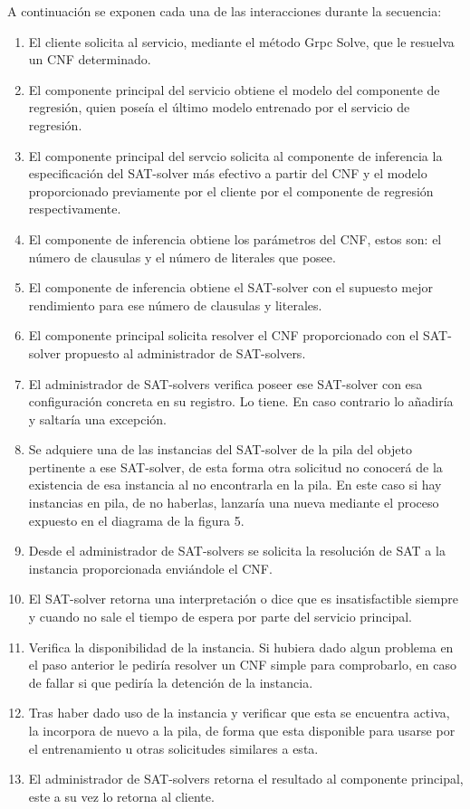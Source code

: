 \documentclass[11pt]{article}
\begin{document}
					A continuación se exponen cada una de las interacciones durante la secuencia:
					\begin{enumerate}
						\item El cliente solicita al servicio, mediante el método Grpc Solve, que le resuelva un CNF determinado.
						\item El componente principal del servicio obtiene el modelo del componente de regresión, quien poseía el último modelo entrenado por el servicio de regresión.
						\item El componente principal del servcio solicita al componente de inferencia la especificación del SAT-solver más efectivo a partir del CNF y el modelo proporcionado previamente 
							 por el cliente por el componente de regresión respectivamente.
						\item El componente de inferencia obtiene los parámetros del CNF, estos son: el número de clausulas y el número de literales que posee.
						\item El componente de inferencia obtiene el SAT-solver con el supuesto mejor rendimiento para ese número de clausulas y literales.
						\item El componente principal solicita resolver el CNF proporcionado con el SAT-solver propuesto al administrador de SAT-solvers.
						\item El administrador de SAT-solvers verifica poseer ese SAT-solver con esa configuración concreta en su registro. Lo tiene. En caso contrario lo añadiría y saltaría una excepción.
						\item Se adquiere una de las instancias del SAT-solver de la pila del objeto pertinente a ese SAT-solver, de esta forma otra solicitud no conocerá de la existencia de esa instancia al no
							encontrarla en la pila. En este caso si hay instancias en pila, de no haberlas, lanzaría una nueva mediante el proceso expuesto en el diagrama de la figura 5.
						\item Desde el administrador de SAT-solvers se solicita la resolución de SAT a la instancia proporcionada enviándole el CNF.
						\item El SAT-solver retorna una interpretación o dice que es insatisfactible siempre y cuando no sale el tiempo de espera por parte del servicio principal.
						\item Verifica la disponibilidad de la instancia. Si hubiera dado algun problema en el paso anterior le pediría resolver un CNF simple para comprobarlo, en caso de fallar
							si que pediría la detención de la instancia.
						\item Tras haber dado uso de la instancia y verificar que esta se encuentra activa, la incorpora de nuevo a la pila, de forma que esta disponible para usarse por el 
							entrenamiento u otras solicitudes similares a esta.
						\item El administrador de SAT-solvers retorna el resultado al componente principal, este a su vez lo retorna al cliente.
					\end{enumerate}
\end{document}
